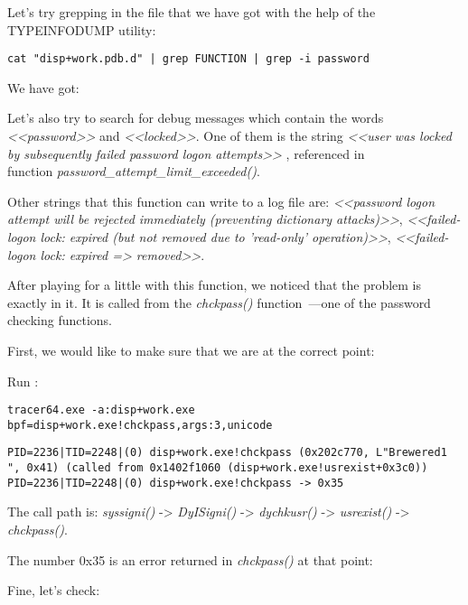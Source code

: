 Let's try grepping in the file that we have got with the help of the TYPEINFODUMP utility:

\begin{lstlisting}
cat "disp+work.pdb.d" | grep FUNCTION | grep -i password
\end{lstlisting}

We have got:



Let's also try to search for debug messages which contain the words \emph{<<password>>} and \emph{<<locked>>}.
One of them is the string \emph{<<user was locked by subsequently failed password logon attempts>>} , referenced in \\
function \emph{password\_attempt\_limit\_exceeded()}.

Other strings that this function can write to a log file are: 
\emph{<<password logon attempt will be rejected immediately (preventing dictionary attacks)>>}, \emph{<<failed-logon lock: expired (but not removed due to 'read-only' operation)>>}, \emph{<<failed-logon lock: expired => removed>>}.

After playing for a little with this function, we noticed that the problem is exactly in it.
It is called from the \emph{chckpass()} function~---one of the password checking functions.

First, we would like to make sure that we are at the correct point:

Run \tracer:

\begin{lstlisting}
tracer64.exe -a:disp+work.exe bpf=disp+work.exe!chckpass,args:3,unicode
\end{lstlisting}

\begin{lstlisting}
PID=2236|TID=2248|(0) disp+work.exe!chckpass (0x202c770, L"Brewered1                               ", 0x41) (called from 0x1402f1060 (disp+work.exe!usrexist+0x3c0))
PID=2236|TID=2248|(0) disp+work.exe!chckpass -> 0x35
\end{lstlisting}

The call path is: \emph{syssigni()} -> \emph{DyISigni()} -> \emph{dychkusr()} -> \emph{usrexist()} -> \emph{chckpass()}.

The number 0x35 is an error returned in \emph{chckpass()} at that point:



Fine, let's check:

